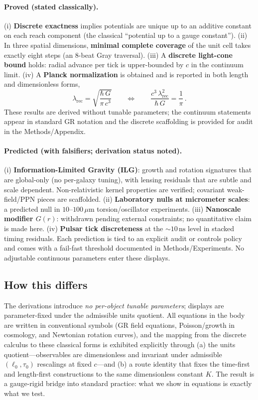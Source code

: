 \documentclass[11pt]{article}
\begin{document}
\paragraph{Proved (stated classically).}
(i) \textbf{Discrete exactness} implies potentials are unique up to an additive constant on each reach component (the classical ``potential up to a gauge constant''). (ii) In three spatial dimensions, \textbf{minimal complete coverage} of the unit cell takes exactly eight steps (an 8-beat Gray traversal). (iii) A \textbf{discrete light-cone bound} holds: radial advance per tick is upper-bounded by $c$ in the continuum limit. (iv) A \textbf{Planck normalization} is obtained and is reported in both length and dimensionless forms,
\[
\lambda_{\mathrm{rec}}=\sqrt{\frac{\hbar\,G}{\pi\,c^{3}}}\qquad\Longleftrightarrow\qquad
\frac{c^{3}\,\lambda_{\mathrm{rec}}^{2}}{\hbar\,G}=\frac{1}{\pi}\,.
\]
These results are derived without tunable parameters; the continuum statements appear in standard GR notation and the discrete scaffolding is provided for audit in the Methods/Appendix.

\paragraph{Predicted (with falsifiers; derivation status noted).}
(i) \textbf{Information-Limited Gravity (ILG)}: growth and rotation signatures that are 
global-only (no per-galaxy tuning), with lensing residuals that are subtle and scale dependent. 
Non-relativistic kernel properties are verified; covariant weak-field/PPN pieces are scaffolded. 
(ii) \textbf{Laboratory nulls at micrometer scales}: a predicted null in 
$10$--$100\,\mu\mathrm{m}$ torsion/oscillator experiments. 
(iii) \textbf{Nanoscale modifier $G(r)$}: withdrawn pending external constraints; no quantitative claim is made here.
(iv) \textbf{Pulsar tick discreteness} at the $\sim 10\,\mathrm{ns}$ level in stacked timing residuals. 
Each prediction is tied to an explicit audit or controls policy and comes with a fail-fast 
threshold documented in Methods/Experiments. No adjustable continuous parameters enter these displays.

\subsection*{How this differs}
The derivations introduce \emph{no per-object tunable parameters}; displays are parameter-fixed under the admissible units quotient. All equations in the body are written in conventional symbols (GR field equations, Poisson/growth in cosmology, and Newtonian rotation curves), and the mapping from the discrete calculus to these classical forms is exhibited explicitly through (a) the units quotient—observables are dimensionless and invariant under admissible $(\ell_0,\tau_0)$ rescalings at fixed $c$—and (b) a route identity that fixes the time-first and length-first constructions to the same dimensionless constant $K$. The result is a gauge-rigid bridge into standard practice: what we show in equations is exactly what we test.
\end{document}
